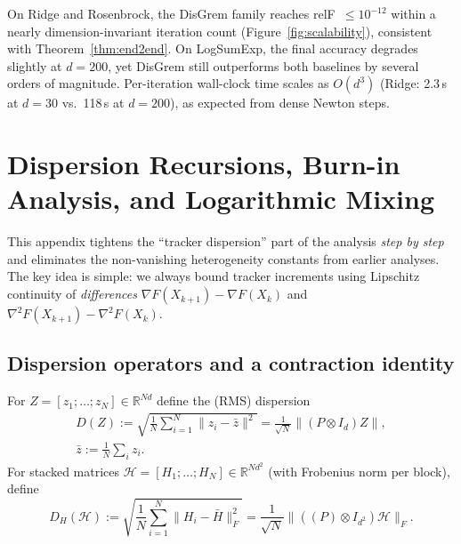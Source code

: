 \documentclass[10pt,twocolumn,letterpaper]{article}
\def\cO{O}%
\def\one{1}%
\def\J{J}%
\def\Pmat{P}%
\theoremstyle{compact}
\theoremstyle{compactremark}
\newcommand{\R}{\mathbb{R}}
\newcommand{\one}{\mathbf{1}}
\newcommand{\cO}{\mathcal{O}}
\newcommand{\J}{\left(\frac{1}{N}\one\one^\top\right)}
\newcommand{\Pmat}{I-\J}
\begin{document}
On Ridge and Rosenbrock, the DisGrem family reaches
relF~$\le 10^{-12}$ within a nearly dimension-invariant iteration
count (Figure~\ref{fig:scalability}), consistent with
Theorem~\ref{thm:end2end}.
On LogSumExp, the final accuracy degrades slightly at $d=200$, yet
DisGrem still outperforms both baselines by several orders of magnitude.
Per-iteration wall-clock time scales as $\cO(d^3)$ (Ridge: 2.3\,s at $d{=}30$ vs.\
118\,s at $d{=}200$), as expected from dense Newton steps.

\section{Dispersion Recursions, Burn-in Analysis, and Logarithmic Mixing}\label{app:dispersion}

This appendix tightens the ``tracker dispersion'' part of the analysis \emph{step by step} and eliminates the
non-vanishing heterogeneity constants from earlier analyses. The key idea is simple:
we always bound tracker increments using Lipschitz continuity of \emph{differences}
$\nabla F(X_{k+1})-\nabla F(X_k)$ and $\nabla^2F(X_{k+1})-\nabla^2F(X_k)$.

\subsection{Dispersion operators and a contraction identity}

For $Z=[z_1;\dots;z_N]\in\R^{Nd}$ define the (RMS) dispersion
\begin{gather*}
D(Z):=\sqrt{\tfrac1N\textstyle\sum_{i=1}^N\|z_i\!-\!\bar z\|^2}
=\tfrac{1}{\sqrt N}\|(\Pmat\!\otimes\! I_d)Z\|,\\
\bar z:=\tfrac1N\textstyle\sum_i z_i.
\end{gather*}
For stacked matrices $\mathcal H=[H_1;\dots;H_N]\in\R^{Nd^2}$ (with Frobenius norm per block),
define
\[
D_H(\mathcal H):=\sqrt{\frac1N\sum_{i=1}^N\|H_i-\bar H\|_F^2}
=\frac{1}{\sqrt N}\big\|((\Pmat)\otimes I_{d^2})\mathcal H\big\|_F.
\]
\end{document}
